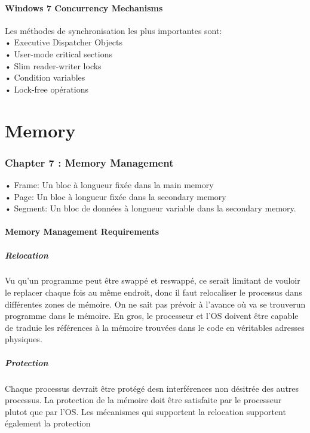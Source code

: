 \subsection{Windows 7 Concurrency Mechanisms}
Les méthodes de synchronisation les plus importantes sont: \\
• Executive Dispatcher Objects \\
• User-mode critical sections \\
• Slim reader-writer locks\\
• Condition variables \\
• Lock-free opérations

\newpage
\part{Memory}


\section{Chapter 7 : Memory Management}
• Frame: Un bloc à longueur fixée dans la main memory \\
• Page: Un bloc à longueur fixée dans la secondary memory \\
• Segment: Un bloc de données à longueur variable dans la secondary memory. \\
\subsection{Memory Management Requirements}
\subsubsection{Relocation}
Vu qu’un programme peut être swappé et reswappé, ce serait limitant de vouloir le replacer chaque fois au même endroit, donc il faut relocaliser le processus dans différentes zones de mémoire. On ne sait pas prévoir à l’avance où va se trouverun programme dans le mémoire. En gros, le processeur et l’OS doivent être capable de traduie les références à la mémoire trouvées dans le code en véritables adresses physiques.
\subsubsection{Protection}
Chaque processus devrait être protégé desn interférences non désitrée des autres processus. La protection de la mémoire doit être satisfaite par le processeur plutot que par l’OS. Les mécanismes qui supportent la relocation supportent également la protection
